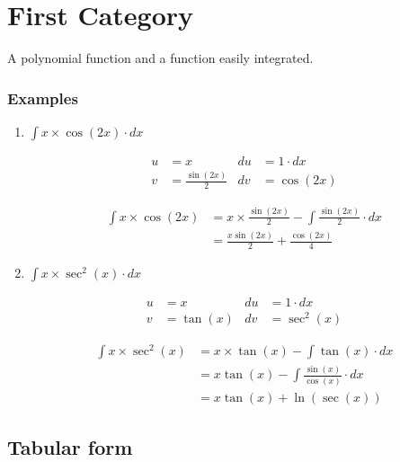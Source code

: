 \documentclass[a4paper]{book}
\begin{document}
\section{First Category}

A polynomial function and a function easily integrated.

\subsubsection{Examples}

\begin{enumerate}

  \item $\displaystyle{\int x \times \cos(2x) \cdot dx}$

    \begin{align*}
      u & = x & du & = 1 \cdot dx \\
      v & = \frac{\sin(2x)}{2} & dv & = \cos(2x)
    \end{align*}

    \begin{align*}
      \int x \times \cos(2x) & = x \times \frac{\sin(2x)}{2} - \int \frac{\sin(2x)}{2} \cdot dx \\
                             & = \frac{x \sin(2x)}{2} + \frac{\cos(2x)}{4}
    \end{align*}

  \item $\displaystyle{\int x \times \sec^2(x) \cdot dx}$

    \begin{align*}
      u & = x & du & = 1 \cdot dx \\
      v & = \tan(x) & dv & = \sec^2(x)
    \end{align*}

    \begin{align*}
      \int x \times \sec^2(x) & = x \times \tan(x) - \int \tan(x) \cdot dx \\
                              & = x \tan(x) - \int \frac{\sin(x)}{\cos(x)} \cdot dx \\
                              & = x \tan(x) + \ln(\sec(x))
    \end{align*}

\end{enumerate}

\subsection{Tabular form}
\end{document}
